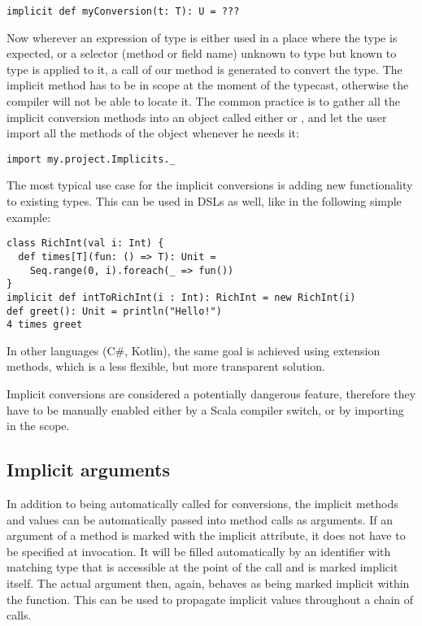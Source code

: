 \lstset{style=Scala}
\begin{lstlisting}
implicit def myConversion(t: T): U = ???
\end{lstlisting}

Now wherever an expression of type  is either used in a place where the type  is expected, or a selector (method or field name) unknown to type  but known to type  is applied to it, a call of our  method is generated to convert the type. The implicit method has to be in scope at the moment of the typecast, otherwise the compiler will not be able to locate it. The common practice is to gather all the implicit conversion methods into an object called either  or , and let the user import all the methods of the object whenever he needs it:

\lstset{style=Scala}
\begin{lstlisting}
import my.project.Implicits._
\end{lstlisting}

The most typical use case for the implicit conversions is adding new functionality to existing types. This can be used in DSLs as well, like in the following simple example:

\lstset{style=Scala}
\begin{lstlisting}
class RichInt(val i: Int) {
  def times[T](fun: () => T): Unit =
    Seq.range(0, i).foreach(_ => fun())
}
implicit def intToRichInt(i : Int): RichInt = new RichInt(i)
def greet(): Unit = println("Hello!")
4 times greet
\end{lstlisting}

In other languages (C\#, Kotlin), the same goal is achieved using extension methods, which is a less flexible, but more transparent solution.

Implicit conversions are considered a potentially dangerous feature, therefore they have to be manually enabled either by a Scala compiler switch, or by importing  in the scope.

\subsection{Implicit arguments}
\label{subsec:implicit_args}

In addition to being automatically called for conversions, the implicit methods and values can be automatically passed into method calls as arguments. If an argument of a method is marked with the implicit attribute, it does not have to be specified at invocation. It will be filled automatically by an identifier with matching type that is accessible at the point of the call and is marked implicit itself. The actual argument then, again, behaves as being marked implicit within the function. This can be used to propagate implicit values throughout a chain of calls.

